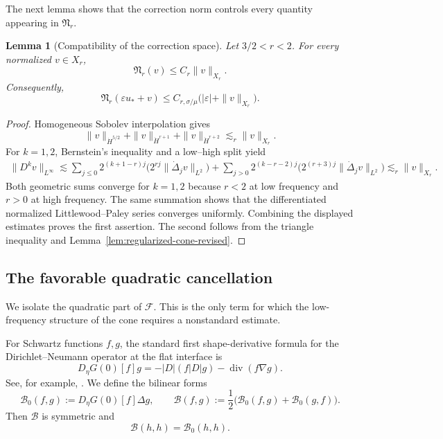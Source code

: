 \documentclass[12pt]{amsart}
\newtheorem{lemma}[theorem]{Lemma}
\theoremstyle{remark}
\theoremstyle{definition}
\numberwithin{equation}{section}
\begin{document}
The next lemma shows that the correction norm controls every quantity
appearing in \(\mathfrak N_r\).

\begin{lemma}[Compatibility of the correction space]
\label{lem:Xr-cone-embedding-revised}
Let \(3/2<r<2\).
For every normalized \(v\in X_r\),
\begin{equation*}
 \mathfrak N_r(v) \leq C_r\|v\|_{X_r}.
\end{equation*}
Consequently,
\begin{equation*}
 \mathfrak N_r(\varepsilon u_*+v) \leq C_{r,\sigma/\mu}\bigl(|\varepsilon|+\|v\|_{X_r}\bigr).
\end{equation*}
\end{lemma}

\begin{proof}
Homogeneous Sobolev interpolation gives
\[
 \|v\|_{\dot H^{5/2}}+ \|v\|_{\dot H^{r+1}}+ \|v\|_{\dot H^{r+2}} \lesssim_r\|v\|_{X_r}.
\]
For \(k=1,2\), Bernstein's inequality and a low--high split yield
\begin{align*}
 \|D^kv\|_{L^\infty} \lesssim \sum_{j\leq0}2^{(k+1-r)j}
   \bigl(2^{rj}\|\dot\Delta_jv\|_{L^2}\bigr)+\sum_{j>0}2^{(k-r-2)j}
   \bigl(2^{(r+3)j}\|\dot\Delta_jv\|_{L^2}\bigr)
 \lesssim_r\|v\|_{X_r}.
\end{align*}
Both geometric sums converge for \(k=1,2\) because \(r<2\) at low
frequency and \(r>0\) at high frequency.  
The same summation shows that the differentiated normalized Littlewood--Paley series converges uniformly.  
Combining the displayed estimates proves the first assertion.  
The second follows from the triangle inequality and Lemma~\ref{lem:regularized-cone-revised}.
\end{proof}

\subsection{The favorable quadratic cancellation}

We isolate the quadratic part of \(\mathscr F\). 
This is the only term for which the low-frequency structure of the cone requires a nonstandard estimate.

For Schwartz functions \(f,g\), the standard first shape-derivative
formula for the Dirichlet--Neumann operator at the flat interface is
\begin{equation}\label{eq:first-shape-derivative-flat}
 D_\eta G(0)[f]g = -|D|(f|D|g)-\operatorname{div}(f\nabla g).
\end{equation}
See, for example, \cite{Lannes05,Lannes11}. 
We define the bilinear forms
\begin{equation} \label{BB0Def}
 \mathcal B_0(f,g):= D_\eta G(0)[f]\Delta g, \qquad \mathcal B(f,g) := \frac12 \bigl( \mathcal B_0(f,g)+\mathcal B_0(g,f) \bigr).
\end{equation}
Then \(\mathcal B\) is symmetric and
\[
 \mathcal B(h,h)=\mathcal B_0(h,h).
\]
\end{document}
